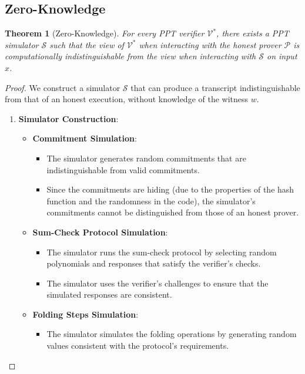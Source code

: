 \documentclass{article}
\theoremstyle{plain}
\newtheorem{theorem}{Theorem}[section]
\theoremstyle{definition}
\theoremstyle{remark}
\theoremstyle{problem}
\begin{document}
\subsection{Zero-Knowledge}

\begin{theorem}[Zero-Knowledge]
\label{thm:zero-knowledge}
For every PPT verifier \(\mathcal{V}^*\), there exists a PPT simulator \(\mathcal{S}\) such that the view of \(\mathcal{V}^*\) when interacting with the honest prover \(\mathcal{P}\) is computationally indistinguishable from the view when interacting with \(\mathcal{S}\) on input \(x\).
\end{theorem}

\begin{proof}
We construct a simulator \(\mathcal{S}\) that can produce a transcript indistinguishable from that of an honest execution, without knowledge of the witness \(w\).

\begin{enumerate}
    \item \textbf{Simulator Construction}:
    \begin{itemize}
        \item \textbf{Commitment Simulation}:
        \begin{itemize}
            \item The simulator generates random commitments that are indistinguishable from valid commitments.
            \item Since the commitments are hiding (due to the properties of the hash function and the randomness in the code), the simulator's commitments cannot be distinguished from those of an honest prover.
        \end{itemize}

        \item \textbf{Sum-Check Protocol Simulation}:
        \begin{itemize}
            \item The simulator runs the sum-check protocol by selecting random polynomials and responses that satisfy the verifier's checks.
            \item The simulator uses the verifier's challenges to ensure that the simulated responses are consistent.
        \end{itemize}

        \item \textbf{Folding Steps Simulation}:
        \begin{itemize}
            \item The simulator simulates the folding operations by generating random values consistent with the protocol's requirements.
        \end{itemize}
    \end{itemize}


\end{enumerate}
\end{proof}
\end{document}
